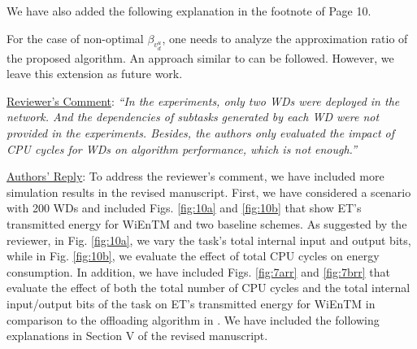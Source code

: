 \documentclass[12pt,draftclsnofoot,onecolumn]{IEEEtran}
\newcommand{\rev}[1]{{\color{blue}#1}} %
\newcommand{\rev}[1]{#1}
\newenvironment{my}[2]%
{\begin{list}{}%
{\setlength{\rightmargin}{#1}\setlength{\leftmargin}{#2}}%


 \item[]{}

} {\end{list}}
\begin{document}
\begin{enumerate}
We have also added the following explanation in the footnote of Page 10.\newline

\begin{my}{1cm}{1cm}
	\rev{
		For the case of non-optimal $\beta_{v_d^u}$, one needs to analyze the approximation ratio of the proposed algorithm. An approach similar to \cite{b2} can be followed. However, we leave this extension as future work.\newline
	}
\end{my}

\item \underline{Reviewer's Comment}: \textit {``In the experiments, only two WDs were deployed in the network. And the dependencies of subtasks generated by each WD were not provided in the experiments. Besides, the authors only evaluated the impact of CPU cycles for WDs on algorithm performance, which is not enough.''} \newline

\underline{Authors' Reply}: To address the reviewer's comment, we have included more simulation results in the revised manuscript. First, we have considered a scenario with 200 WDs and included Figs. \ref{fig:10a} and \ref{fig:10b} that show ET’s transmitted energy for WiEnTM and two baseline schemes. As suggested by the reviewer, in Fig. \ref{fig:10a}, we vary the task's total internal input and output bits, while in Fig. \ref{fig:10b}, we evaluate the effect of total CPU cycles on energy consumption. In addition, we have included Figs. \ref{fig:7arr} and \ref{fig:7brr} that evaluate the effect of both the total number of CPU cycles and the total internal input/output bits of the task on ET's transmitted energy for WiEnTM in comparison to the offloading algorithm in \cite{b13}. We have included the following explanations in Section V of the revised manuscript.\\


\end{enumerate}
\end{document}
